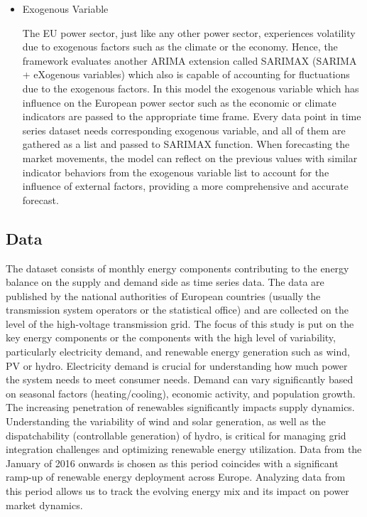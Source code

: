 \documentclass[acmtog]{acmart}
\begin{document}
\begin{itemize}
\item Exogenous Variable

The EU power sector, just like any other power sector, experiences volatility due to exogenous factors such as the climate or the economy. Hence, the framework evaluates another ARIMA extension called SARIMAX (SARIMA + eXogenous variables) which also is capable of accounting for fluctuations due to the exogenous factors. In this model the exogenous variable which has influence on the European power sector such as the economic or climate indicators are passed to the appropriate time frame. Every data point in time series dataset needs corresponding exogenous variable, and all of them are gathered as a list and passed to SARIMAX function. When forecasting the market movements, the model can reflect on the previous values with similar indicator behaviors from the exogenous variable list to account for the influence of external factors, providing a more comprehensive and accurate forecast.
\end{itemize}

\subsection{Data}

The dataset consists of monthly energy components contributing to the energy balance on the supply and demand side as time series data. The data are published by the national authorities of European countries (usually the transmission system operators or the statistical office) and are collected on the level of the high-voltage transmission grid. The focus of this study is put on the key energy components or the components with the high level of variability, particularly electricity demand, and renewable energy generation such as wind, PV or hydro.  Electricity demand  is crucial for understanding how much power the system needs to meet consumer needs. Demand can vary significantly based on seasonal factors (heating/cooling), economic activity, and population growth. The increasing penetration of renewables significantly impacts supply dynamics. Understanding the variability of wind and solar generation, as well as the dispatchability (controllable generation) of hydro, is critical for managing grid integration challenges and optimizing renewable energy utilization. Data from the January of 2016 onwards is chosen as this period coincides with a significant ramp-up of renewable energy deployment across Europe. Analyzing data from this period allows us to track the evolving energy mix and its impact on power market dynamics. \\
\end{document}
